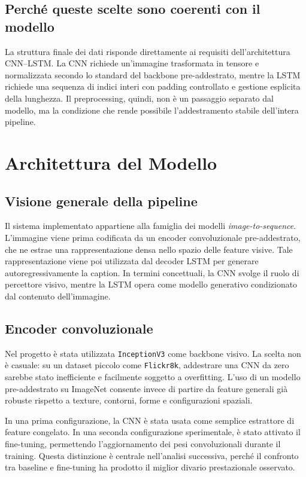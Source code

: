 \documentclass[11pt,a4paper]{report}
\newcommand{\dataset}{\texttt{Flickr8k}}
\begin{document}
\section{Perché queste scelte sono coerenti con il modello}

La struttura finale dei dati risponde direttamente ai requisiti dell'architettura CNN--LSTM. La CNN richiede un'immagine trasformata in tensore e normalizzata secondo lo standard del backbone pre-addestrato, mentre la LSTM richiede una sequenza di indici interi con padding controllato e gestione esplicita della lunghezza. Il preprocessing, quindi, non è un passaggio separato dal modello, ma la condizione che rende possibile l'addestramento stabile dell'intera pipeline.

\chapter{Architettura del Modello}

\section{Visione generale della pipeline}

Il sistema implementato appartiene alla famiglia dei modelli \emph{image-to-sequence}. L'immagine viene prima codificata da un encoder convoluzionale pre-addestrato, che ne estrae una rappresentazione densa nello spazio delle feature visive. Tale rappresentazione viene poi utilizzata dal decoder LSTM per generare autoregressivamente la caption. In termini concettuali, la CNN svolge il ruolo di percettore visivo, mentre la LSTM opera come modello generativo condizionato dal contenuto dell'immagine.

\section{Encoder convoluzionale}

Nel progetto è stata utilizzata \texttt{InceptionV3} come backbone visivo. La scelta non è casuale: su un dataset piccolo come \dataset{}, addestrare una CNN da zero sarebbe stato inefficiente e facilmente soggetto a overfitting. L'uso di un modello pre-addestrato su ImageNet consente invece di partire da feature generali già robuste rispetto a texture, contorni, forme e configurazioni spaziali.

In una prima configurazione, la CNN è stata usata come semplice estrattore di feature congelato. In una seconda configurazione sperimentale, è stato attivato il fine-tuning, permettendo l'aggiornamento dei pesi convoluzionali durante il training. Questa distinzione è centrale nell'analisi successiva, perché il confronto tra baseline e fine-tuning ha prodotto il miglior divario prestazionale osservato.
\end{document}
